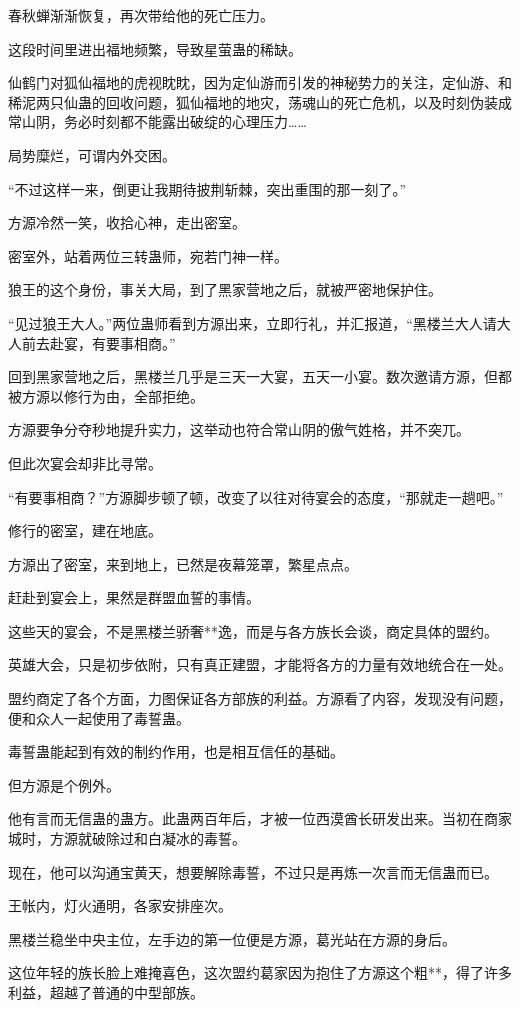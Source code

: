 \begin{this_body}
春秋蝉渐渐恢复，再次带给他的死亡压力。

这段时间里进出福地频繁，导致星萤蛊的稀缺。

仙鹤门对狐仙福地的虎视眈眈，因为定仙游而引发的神秘势力的关注，定仙游、和稀泥两只仙蛊的回收问题，狐仙福地的地灾，荡魂山的死亡危机，以及时刻伪装成常山阴，务必时刻都不能露出破绽的心理压力……

局势糜烂，可谓内外交困。

“不过这样一来，倒更让我期待披荆斩棘，突出重围的那一刻了。”

方源冷然一笑，收拾心神，走出密室。

密室外，站着两位三转蛊师，宛若门神一样。

狼王的这个身份，事关大局，到了黑家营地之后，就被严密地保护住。

“见过狼王大人。”两位蛊师看到方源出来，立即行礼，并汇报道，“黑楼兰大人请大人前去赴宴，有要事相商。”

回到黑家营地之后，黑楼兰几乎是三天一大宴，五天一小宴。数次邀请方源，但都被方源以修行为由，全部拒绝。

方源要争分夺秒地提升实力，这举动也符合常山阴的傲气姓格，并不突兀。

但此次宴会却非比寻常。

“有要事相商？”方源脚步顿了顿，改变了以往对待宴会的态度，“那就走一趟吧。”

修行的密室，建在地底。

方源出了密室，来到地上，已然是夜幕笼罩，繁星点点。

赶赴到宴会上，果然是群盟血誓的事情。

这些天的宴会，不是黑楼兰骄奢**逸，而是与各方族长会谈，商定具体的盟约。

英雄大会，只是初步依附，只有真正建盟，才能将各方的力量有效地统合在一处。

盟约商定了各个方面，力图保证各方部族的利益。方源看了内容，发现没有问题，便和众人一起使用了毒誓蛊。

毒誓蛊能起到有效的制约作用，也是相互信任的基础。

但方源是个例外。

他有言而无信蛊的蛊方。此蛊两百年后，才被一位西漠酋长研发出来。当初在商家城时，方源就破除过和白凝冰的毒誓。

现在，他可以沟通宝黄天，想要解除毒誓，不过只是再炼一次言而无信蛊而已。

王帐内，灯火通明，各家安排座次。

黑楼兰稳坐中央主位，左手边的第一位便是方源，葛光站在方源的身后。

这位年轻的族长脸上难掩喜色，这次盟约葛家因为抱住了方源这个粗**，得了许多利益，超越了普通的中型部族。


\end{this_body}

